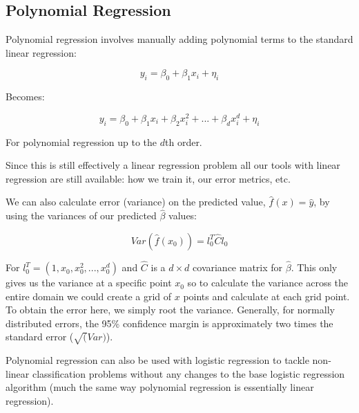 \subsection{Polynomial Regression}

Polynomial regression involves manually adding polynomial terms to the standard linear regression:

$$ y_{i} = \beta_{0} + \beta_{1}x_{i} + \eta_{i} $$

Becomes:

$$ y_{i} = \beta_{0} + \beta_{1}x_{i} + \beta_{2}x_{i}^{2} + ... + \beta_{d}x_{i}^{d} + \eta_{i} $$

For polynomial regression up to the $d$th order.

Since this is still effectively a linear regression problem all our tools with linear regression are still available: how we train it, our error metrics, etc.

We can also calculate error (variance) on the predicted value, $\hat{f}(x)=\hat{y}$, by using the variances of our predicted $\hat{\beta}$ values:

$$ Var(\hat{f}(x_{0})) = l_{0}^{T}\hat{C}l_{0} $$

For $l_{0}^{T}=(1,x_{0},x_{0}^{2},...,x_{0}^{d})$ and $\hat{C}$ is a $d\times d$ covariance matrix for $\hat{\beta}$. This only gives us the variance at a specific point $x_{0}$ so to calculate the variance across the entire domain we could create a grid of $x$ points and calculate at each grid point. To obtain the error here, we simply root the variance. Generally, for normally distributed errors, the 95\% confidence margin is approximately two times the standard error ($\sqrt(Var)$).

Polynomial regression can also be used with logistic regression to tackle non-linear classification problems without any changes to the base logistic regression algorithm (much the same way polynomial regression is essentially linear regression).
